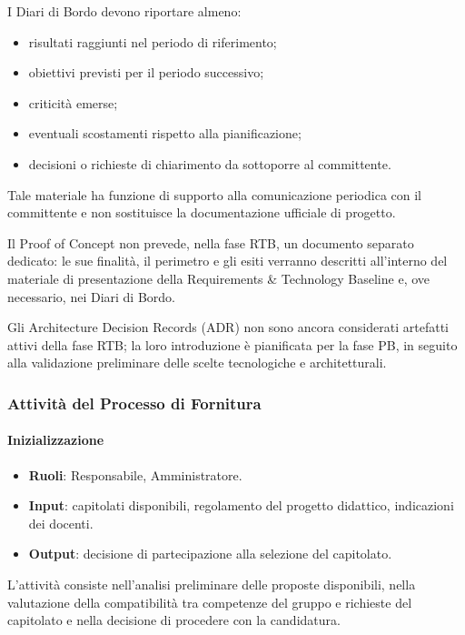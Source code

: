 I Diari di Bordo devono riportare almeno:
\begin{itemize}
    \item risultati raggiunti nel periodo di riferimento;
    \item obiettivi previsti per il periodo successivo;
    \item criticità emerse;
    \item eventuali scostamenti rispetto alla pianificazione;
    \item decisioni o richieste di chiarimento da sottoporre al committente.
\end{itemize}

Tale materiale ha funzione di supporto alla comunicazione periodica con il
committente e non sostituisce la documentazione ufficiale di progetto.

Il Proof of Concept non prevede, nella fase RTB, un documento separato dedicato:
le sue finalità, il perimetro e gli esiti verranno descritti all'interno del materiale
di presentazione della Requirements \& Technology Baseline e, ove necessario, nei Diari
di Bordo.

Gli Architecture Decision Records (ADR) non sono ancora considerati
artefatti attivi della fase RTB; la loro introduzione è pianificata per la fase PB,
in seguito alla validazione preliminare delle scelte tecnologiche e architetturali.


\subsubsection{Attività del Processo di Fornitura}

\paragraph{Inizializzazione}

\begin{itemize}
    \item \textbf{Ruoli}: Responsabile, Amministratore.
    \item \textbf{Input}: capitolati disponibili, regolamento del progetto didattico,
    indicazioni dei docenti.
    \item \textbf{Output}: decisione di partecipazione alla selezione del capitolato.
\end{itemize}

L'attività consiste nell'analisi preliminare delle proposte disponibili, nella
valutazione della compatibilità tra competenze del gruppo e richieste del capitolato
e nella decisione di procedere con la candidatura.

